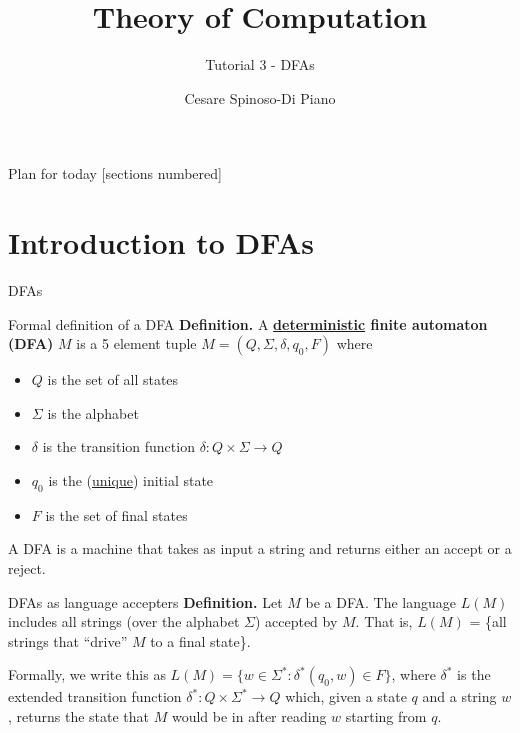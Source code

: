 \documentclass[10pt]{beamer}
\title{Theory of Computation}
\subtitle{Tutorial 3 - DFAs}
\author{Cesare Spinoso-Di Piano}
\date{}
\begin{document}
\maketitle

\begin{frame}{Plan for today}
    [sections numbered]
    \tableofcontents[hideallsubsections]
\end{frame}

\section{Introduction to DFAs}

\begin{frame}{DFAs}

\end{frame}


\begin{frame}[t]{Formal definition of a DFA}
    \textbf{Definition.} A \textbf{\underline{deterministic} finite automaton (DFA)} $M$ is a 5 element tuple $M = (Q, \Sigma, \delta, q_0, F)$ where
    \begin{itemize}
        \item $Q$ is the set of all states
        \item $\Sigma$ is the alphabet
        \item $\delta$ is the transition function $\delta: Q \times \Sigma \rightarrow Q$
        \item $q_0$ is the (\underline{unique}) initial state
        \item $F$ is the set of final states
    \end{itemize}
    A DFA is a machine that takes as input a string and returns either an accept or a reject.
\end{frame}


\begin{frame}{DFAs as language accepters}
    \textbf{Definition.} Let $M$ be a DFA. The language $L(M)$ includes all strings (over the alphabet $\Sigma$) accepted by $M$. That is, $L(M)$ = \{all strings that ``drive'' $M$ to a final state\}. 

    Formally, we write this as $L(M) = \{w \in \Sigma ^*: \delta ^*(q_0,w)\in F\}$, where $\delta^*$ is the extended transition function $\delta ^*: Q\times \Sigma ^*\rightarrow Q$ which, given a state $q$ and a string $w$, returns the state that $M$ would be in after reading $w$ starting from $q$.
\end{frame}
\end{document}
